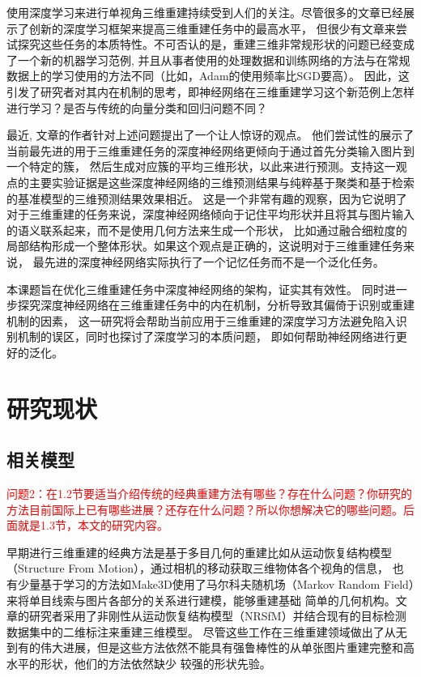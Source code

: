 \documentclass[bachelor, nocolorlinks, printoneside]{seuthesis} %
\newcommand\COMM[1]{\textcolor{red}{#1}}
\begin{document}
\begin{Main}
\FloatBarrier

使用深度学习来进行单视角三维重建持续受到人们的关注。尽管很多的文章已经展示了创新的深度学习框架来提高三维重建任务中的最高水平\cite{li2018point,park2019deepsdf,fan2017point,tatarchenko2017octree,groueix2018papier,yang2018foldingnet,wang2018pixel2mesh,sun2018pix3d,tulsiani2017multi,wu2017marrnet,yan2016perspective}，
但很少有文章来尝试探究这些任务的本质特性。不可否认的是，重建三维非常规形状的问题已经变成了一个新的机器学习范例, 
并且从事者使用的处理数据和训练网络的方法与在常规数据上的学习使用的方法不同（比如，Adam\cite{kingma2014adam}的使用频率比SGD要高）。
因此，这引发了研究者对其内在机制的思考，即神经网络在三维重建学习这个新范例上怎样进行学习？是否与传统的向量分类和回归问题不同？

最近, 文章\cite{tatarchenko2019single}的作者针对上述问题提出了一个让人惊讶的观点。
他们尝试性的展示了当前最先进的用于三维重建任务的深度神经网络更倾向于通过首先分类输入图片到一个特定的簇，
然后生成对应簇的平均三维形状，以此来进行预测。支持这一观点的主要实验证据是这些深度神经网络的三维预测结果与纯粹基于聚类和基于检索的基准模型的三维预测结果效果相近。
这是一个非常有趣的观察，因为它说明了对于三维重建的任务来说，深度神经网络倾向于记住平均形状并且将其与图片输入的语义联系起来，而不是使用几何方法来生成一个形状，
比如通过融合细粒度的局部结构形成一个整体形状。如果这个观点是正确的，这说明对于三维重建任务来说，
最先进的深度神经网络实际执行了一个记忆任务而不是一个泛化任务\cite{arpit2017closer}。

本课题旨在优化三维重建任务中深度神经网络的架构，证实其有效性。
同时进一步探究深度神经网络在三维重建任务中的内在机制，分析导致其偏倚于识别或重建机制的因素，
这一研究将会帮助当前应用于三维重建的深度学习方法避免陷入识别机制的误区，同时也探讨了深度学习的本质问题，
即如何帮助神经网络进行更好的泛化。



\section{研究现状}
\subsection{相关模型}
\COMM{问题2：在1.2节要适当介绍传统的经典重建方法有哪些？存在什么问题？你研究的方法目前国际上已有哪些进展？还存在什么问题？所以你想解决它的哪些问题。后面就是1.3节，本文的研究内容。}
 
早期进行三维重建的经典方法是基于多目几何的重建比如从运动恢复结构模型\cite{Hming2010TheSR}（Structure From Motion），通过相机的移动获取三维物体各个视角的信息，
也有少量基于学习的方法如Make3D\cite{10.1109/TPAMI.2008.132}使用了马尔科夫随机场（Markov Random Field）来将单目线索与图片各部分的关系进行建模，能够重建基础
简单的几何机构。文章\cite{Kar_2015}的研究者采用了非刚性从运动恢复结构模型（NRSfM）并结合现有的目标检测数据集中的二维标注来重建三维模型。
尽管这些工作在三维重建领域做出了从无到有的伟大进展，但是这些方法依然不能具有强鲁棒性的从单张图片重建完整和高水平的形状，他们的方法依然缺少
较强的形状先验。


\end{Main}
\end{document}
